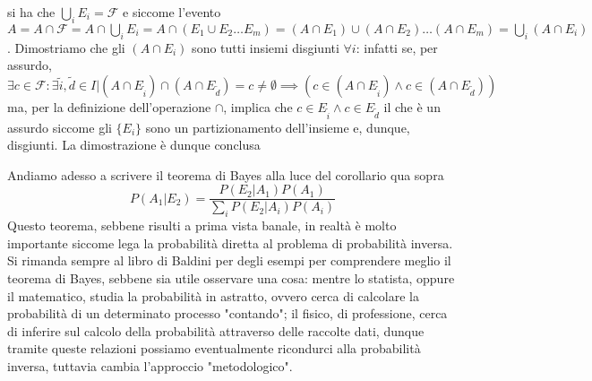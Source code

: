 \documentclass{report}
\begin{document}
\begin{myproof}
	si ha che $\bigcup\limits_i E_i = \mathcal{F}$ e siccome l'evento $A = A \cap \mathcal{F} = A \cap \bigcup\limits_i E_i = A \cap (E_1 \cup E_2 \dots E_m) = (A \cap E_1) \cup (A \cap E_2) \dots (A \cap E_m) = \bigcup\limits_i (A \cap E_i)$. Dimostriamo che gli $(A \cap E_i)$ sono tutti insiemi disgiunti $\forall i$: infatti se, per assurdo, $\exists c \in \mathcal{F} : \exists \tilde{i}, \tilde{d} \in I | (A \cap E_{\tilde{i}}) \cap (A \cap E_{\tilde{d}}) = c \neq \emptyset \implies (c \in (A \cap E_{\tilde{i}}) \wedge c \in (A \cap E_{\tilde{d}}))$ ma, per la definizione dell'operazione $\cap$, implica che $c \in E_{\tilde{i}} \wedge c \in E_{\tilde{d}}$ il che è un assurdo siccome gli $\{ E_i \}$ sono un partizionamento dell'insieme e, dunque, disgiunti.
	La dimostrazione è dunque conclusa
\end{myproof}
\noindent Andiamo adesso a scrivere il teorema di Bayes alla luce del corollario qua sopra
\begin{equation}
	P(A_1 | E_2) = \frac{P(E_2 | A_1)P(A_1)}{\sum\limits_{i} P(E_2 | A_i)P(A_i)}
\end{equation}
Questo teorema, sebbene risulti a prima vista banale, in realtà è molto importante siccome lega la probabilità diretta al problema di probabilità inversa. Si rimanda sempre al libro di Baldini per degli esempi per comprendere meglio il teorema di Bayes, sebbene sia utile osservare una cosa: mentre lo statista, oppure il matematico, studia la probabilità in astratto, ovvero cerca di calcolare la probabilità di un determinato processo "contando"; il fisico, di professione, cerca di inferire sul calcolo della probabilità attraverso delle raccolte dati, dunque tramite queste relazioni possiamo eventualmente ricondurci alla probabilità inversa, tuttavia cambia l'approccio "metodologico".
\end{document}
